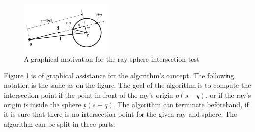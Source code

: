 \documentclass{article}
\begin{document}
\begin{figure} 
    \centering
    \includegraphics[width=0.4\textwidth]{ray_sphere}
    \caption{A graphical motivation for the ray-sphere intersection test}
    \label{fig:raysphere}
\end{figure}

Figure \ref{fig:raysphere} is of graphical assistance for the algorithm's concept. The following notation is the same as on the figure. The goal of the algorithm is to compute the intersection point  if the point in front of the ray's origin $p(s-q)$, or if the ray's origin is inside the sphere $p(s+q)$. The algorithm can terminate beforehand, if it is sure that there is no intersection point for the given ray and sphere. The algorithm can be split in three parts: \cite{realtime_ren}
\end{document}
